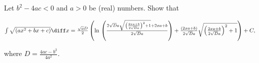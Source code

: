 \label{problemIntegrate sqrt(ax^2+bx+c)dx}
Let $b^2-4ac<0$ and $a>0$ be (real) numbers. Show that 

\noindent $
\int \sqrt{\left(a x^2+b x+c\right)}\diff x = \frac{\sqrt{a} D}{2} \left( \ln{}\left( \frac{2\sqrt{D} a \sqrt{\left(\frac{2 x a+b}{2 \sqrt{D} a}\right)^{2}+1} +2 x a+b}{2 \sqrt{D} a}\right)+\frac{ \left(2 x a+b\right)}{2 \sqrt{D} a} \sqrt{\left(\frac{2 x a+b}{2 \sqrt{D} a}\right)^{2}+1}\right)+C,
$

where 
$\displaystyle D=\frac{4a c-b^2}{4a^2}$.




